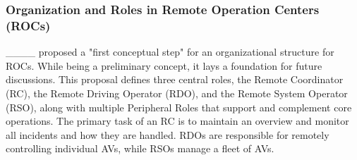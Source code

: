 \subsubsection{Organization and Roles in Remote Operation Centers (ROCs)}
____ proposed a "first conceptual step" for an organizational structure for ROCs. While being a preliminary concept, it lays a foundation for future discussions. This proposal defines three central roles, the Remote Coordinator (RC), the Remote Driving Operator (RDO), and the Remote System Operator (RSO), along with multiple Peripheral Roles that support and complement core operations. 
The primary task of an RC is to maintain an overview and monitor all incidents and how they are handled. RDOs are responsible for remotely controlling individual AVs, while RSOs manage a fleet of AVs. 





